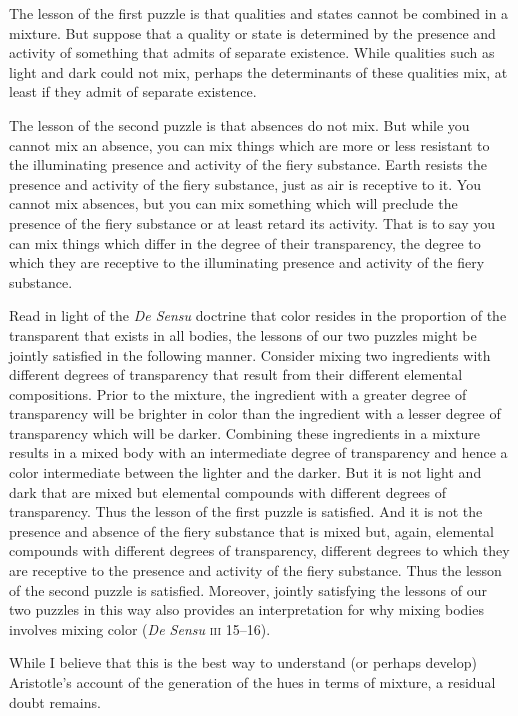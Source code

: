 The lesson of the first puzzle is that qualities and states cannot be combined in a mixture. But suppose that a quality or state is determined by the presence and activity of something that admits of separate existence. While qualities such as light and dark could not mix, perhaps the determinants of these qualities mix, at least if they admit of separate existence.

The lesson of the second puzzle is that absences do not mix. But while you cannot mix an absence, you can mix things which are more or less resistant to the illuminating presence and activity of the fiery substance. Earth resists the presence and activity of the fiery substance, just as air is receptive to it. You cannot mix absences, but you can mix something which will preclude the presence of the fiery substance or at least retard its activity. That is to say you can mix things which differ in the degree of their transparency, the degree to which they are receptive to the illuminating presence and activity of the fiery substance.

Read in light of the \emph{De Sensu} doctrine that color resides in the proportion of the transparent that exists in all bodies, the lessons of our two puzzles might be jointly satisfied in the following manner. Consider mixing two ingredients with different degrees of transparency that result from their different elemental compositions. Prior to the mixture, the ingredient with a greater degree of transparency will be brighter in color than the ingredient with a lesser degree of transparency which will be darker. Combining these ingredients in a mixture results in a mixed body with an intermediate degree of transparency and hence a color intermediate between the lighter and the darker. But it is not light and dark that are mixed but elemental compounds with different degrees of transparency. Thus the lesson of the first puzzle is satisfied. And it is not the presence and absence of the fiery substance that is mixed but, again, elemental compounds with different degrees of transparency, different degrees to which they are receptive to the presence and activity of the fiery substance. Thus the lesson of the second puzzle is satisfied. Moreover, jointly satisfying the lessons of our two puzzles in this way also provides an interpretation for why mixing bodies involves mixing color (\emph{De Sensu} \textsc{iii} 15--16).

While I believe that this is the best way to understand (or perhaps develop) Aristotle's account of the generation of the hues in terms of mixture, a residual doubt remains. 


